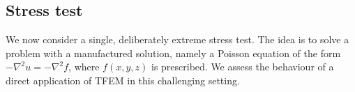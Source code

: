 \documentclass{article}
\begin{document}





% 


\subsection{Stress test}

We now consider a single, deliberately extreme stress test. The idea is to solve a problem
with a manufactured solution, namely a Poisson equation of the form
$-\nabla^2 u = -\nabla^2 f$, where $f(x,y,z)$ is prescribed.
We assess the behaviour of a direct application of TFEM in this challenging setting.
\end{document}
